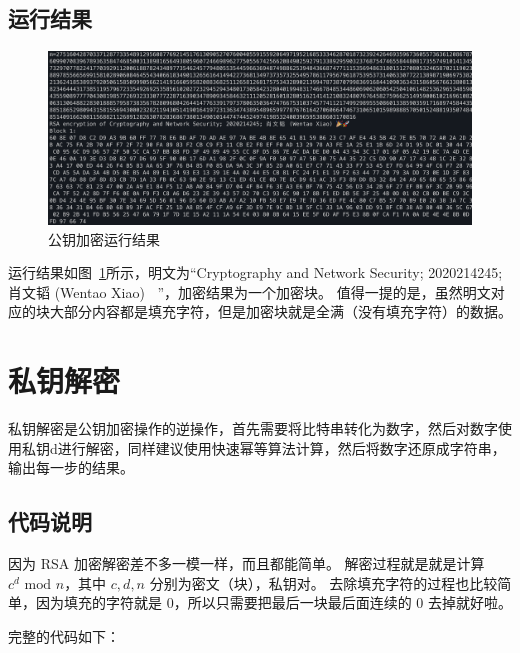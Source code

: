 \documentclass[degree=project,degree-type=project,cjk-font=windows]{thuthesis}
\begin{document}
\subsection{运行结果}

\begin{figure}[h]
\centering%
\includegraphics[width=\linewidth]{rsa_t2.png}
  \caption{公钥加密运行结果}
  \label{fig:t2}
\end{figure}

运行结果如图~\ref{fig:t2}所示，明文为“Cryptography and Network Security; 2020214245; 肖文韬 (Wentao Xiao) 🎉🚀”，加密结果为一个加密块。
值得一提的是，虽然明文对应的块大部分内容都是填充字符，但是加密块就是全满（没有填充字符）的数据。

\section{私钥解密}

私钥解密是公钥加密操作的逆操作，首先需要将比特串转化为数字，然后对数字使用私钥d进行解密，同样建议使用快速幂等算法计算，然后将数字还原成字符串，输出每一步的结果。

\subsection{代码说明}

因为 RSA 加密解密差不多一模一样，而且都能简单。
解密过程就是就是计算 $c^d \text{ mod } n$，其中 $c, d, n$ 分别为密文（块），私钥对。
去除填充字符的过程也比较简单，因为填充的字符就是 0，所以只需要把最后一块最后面连续的 0 去掉就好啦。

完整的代码如下：
\end{document}
